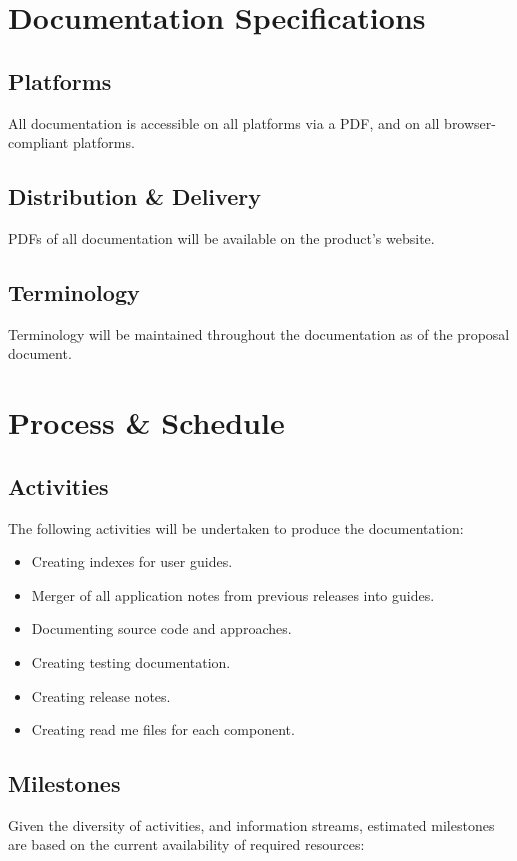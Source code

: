 \section{Documentation Specifications}
\subsection{Platforms}
All documentation is accessible on all platforms via a PDF, and on all browser-compliant platforms.

\subsection{Distribution \& Delivery}
PDFs of all documentation will be available on the product's website.

\subsection{Terminology}
Terminology will be maintained throughout the documentation as of the proposal document.

\section{Process \& Schedule}
\subsection{Activities}
The following activities will be undertaken to produce the documentation:
\begin{itemize}
	\item Creating indexes for user guides.
	\item Merger of all application notes from previous releases into guides.
	\item Documenting source code and approaches.
	\item Creating testing documentation.
	\item Creating release notes.
	\item Creating read me files for each component.
\end{itemize}

\subsection{Milestones}
Given the diversity of activities, and information streams, estimated milestones are based on the current availability of required resources:

